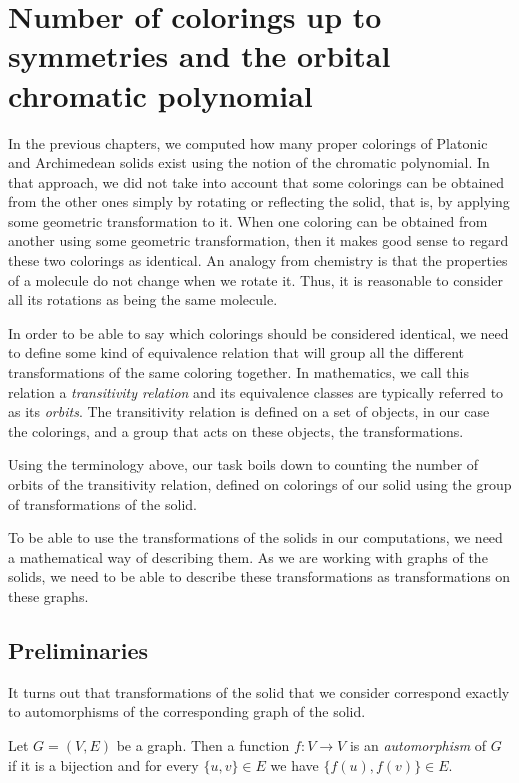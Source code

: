 \chapter{Number of colorings up to symmetries and the orbital chromatic polynomial}
\label{chap:clrings-up-to-symmetries}

In the previous chapters, we computed how many proper colorings of Platonic and Archimedean solids exist using the notion of the chromatic polynomial. In that approach, we did not take into account that some colorings can be obtained from the other ones simply by rotating or reflecting the solid, that is, by applying some geometric transformation to it. When one coloring can be obtained from another using some geometric transformation, then it makes good sense to regard these two colorings as identical. An analogy from chemistry is that the properties of a molecule do not change when we rotate it. Thus, it is reasonable to consider all its rotations as being the same molecule. 

In order to be able to say which colorings should be considered identical, we need to define some kind of equivalence relation that will group all the different transformations of the same coloring together. In mathematics, we call this relation a \textit{transitivity relation} and its equivalence classes are typically referred to as its \textit{orbits}. The transitivity relation is defined on a set of objects, in our case the colorings, and a group that acts on these objects, the transformations.

Using the terminology above, our task boils down to counting the number of orbits of the transitivity relation, defined on colorings of our solid using the group of transformations of the solid.

To be able to use the transformations of the solids in our computations, we need a mathematical way of describing them. As we are working with graphs of the solids, we need to be able to describe these transformations as transformations on these graphs.


\section{Preliminaries}

It turns out that transformations of the solid that we consider correspond exactly to automorphisms of the corresponding graph of the solid.

\begin{defn}[automorphism]
    Let $G=(V,E)$ be a graph. Then a function $f:V \rightarrow V$ is an \emph{automorphism} of $G$ if it is a bijection and for every $\{u,v\} \in E$ we have $\{f(u),f(v)\} \in E$.
\end{defn}

